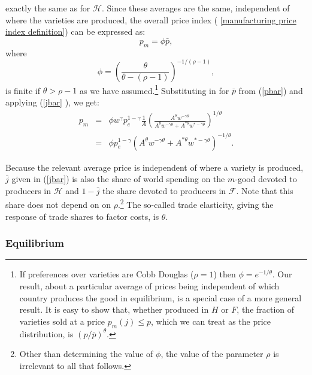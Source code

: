 \documentclass[notitlepage,12pt]{article}
\begin{document}
exactly the same as for $\mathcal{H}$. Since these averages are the same,
independent of where the varieties are produced, the overall price index (%
\ref{manufacturing price index definition}) can be expressed as:%
\begin{equation*}
p_{m}=\phi \bar{p},
\end{equation*}%
where 
\begin{equation*}
\phi =\left( \frac{\theta }{\theta -\left( \rho -1\right) }\right)
^{-1/(\rho -1)},
\end{equation*}%
is finite if $\theta >\rho -1$ as we have assumed.\footnote{%
If preferences over varieties are Cobb Douglas ($\rho =1$) then $\phi
=e^{-1/\theta }$. Our result, about a particular average of prices being
independent of which country produces the good in equilibrium, is a special
case of a more general result. It is easy to show that, whether produced in $%
H$ or $F$, the fraction of varieties sold at a price $p_{m}(j)\leq p$, which
we can treat as the price distribution, is $\left( p/\bar{p}\right) ^{\theta
}$.} Substituting in for $\bar{p}$ from (\ref{pbar}) and applying (\ref{jbar}%
), we get: 
\begin{eqnarray*}
p_{m} &=&\phi w^{\gamma }p_{e}^{1-\gamma }\frac{1}{A}\left( \frac{A^{\theta
}w^{-\gamma \theta }}{A^{\theta }w^{-\gamma \theta }+A^{\ast \theta }w^{\ast
-\gamma \theta }}\right) ^{1/\theta } \\
&=&\phi p_{e}^{1-\gamma }\left( A^{\theta }w^{-\gamma \theta }+A^{\ast
\theta }w^{\ast -\gamma \theta }\right) ^{-1/\theta }.
\end{eqnarray*}

Because the relevant average price is independent of where a variety is
produced, $\bar{j}$ given in (\ref{jbar}) is also the share of world
spending on the $m$-good devoted to producers in $\mathcal{H}$ and $1-\bar{j}
$ the share devoted to producers in $\mathcal{F}$. Note that this share does
not depend on on $\rho $.\footnote{%
Other than determining the value of $\phi $, the value of the parameter $%
\rho $ is irrelevant to all that follows.} The so-called trade elasticity,
giving the response of trade shares to factor costs, is $\theta $.

\subsubsection{Equilibrium}
\end{document}
